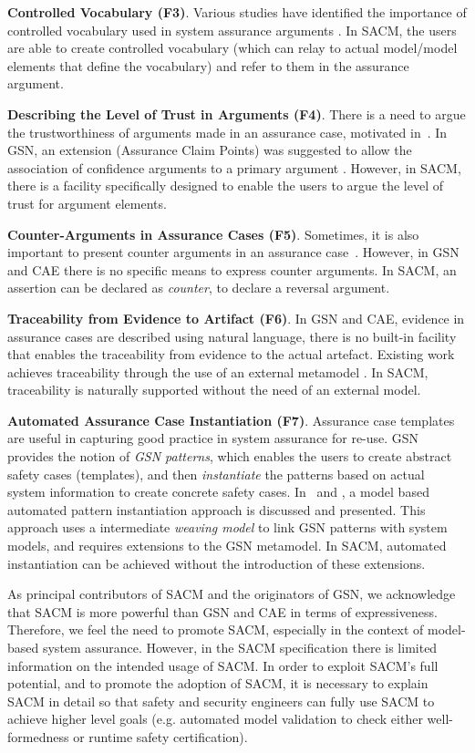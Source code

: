 \textbf{Controlled Vocabulary (F3)}. Various studies have identified the importance of controlled vocabulary used in system assurance arguments \cite{luo2015safety, attwood2014use}. 
In SACM, the users are able to create controlled vocabulary (which can relay to actual model/model elements that define the vocabulary) and refer to them in the assurance argument. 

\textbf{Describing the Level of Trust in Arguments (F4)}. There is a need to argue the trustworthiness of arguments made in an assurance case, motivated in~\cite{hawkins2011new}. 
In GSN, an extension (Assurance Claim Points) was suggested to allow the association of confidence arguments to a primary argument \cite{hawkins2011new}.  
However, in SACM, there is a facility specifically designed to enable the users to argue the level of trust for argument elements.

\textbf{Counter-Arguments in Assurance Cases (F5)}. Sometimes, it is also important to present counter arguments in an assurance case~\cite{armstrong2004deconstruction}.
However, in GSN and CAE there is no specific means to express counter arguments. 
In SACM, an assertion can be declared as \textit{counter}, to declare a reversal argument.

\textbf{Traceability from Evidence to Artifact (F6)}. In GSN and CAE, evidence in assurance cases are described using natural language, there is no built-in facility that enables the traceability from evidence to the actual artefact. 
Existing work achieves traceability through the use of an external metamodel \cite{taguchi2014linking}.
In SACM, traceability is naturally supported without the need of an external model.

\textbf{Automated Assurance Case Instantiation (F7)}. Assurance case templates are useful in capturing good practice in system assurance for re-use.
GSN provides the notion of \textit{GSN patterns}, which enables the users to create abstract safety cases (templates), and then \textit{instantiate} the patterns based on actual system information to create concrete safety cases. 
In~\cite{hawkins2015need} and \cite{hawkins2015weaving}, a model based automated pattern instantiation approach is discussed and presented. 
This approach uses a intermediate \textit{weaving model} to link GSN patterns with system models, and requires extensions to the GSN metamodel. 
In SACM, automated instantiation can be achieved without the introduction of these extensions. 

As principal contributors of SACM and the originators of GSN, we acknowledge that SACM is more powerful than GSN and CAE in terms of expressiveness.
Therefore, we feel the need to promote SACM, especially in the context of model-based system assurance.
However, in the SACM specification there is limited information on the intended usage of SACM. 
In order to exploit SACM's full potential, and to promote the adoption of SACM, it is necessary to explain SACM in detail so that safety and security engineers can fully use SACM to achieve higher level goals (e.g. automated model validation to check either well-formedness or runtime safety certification). 

